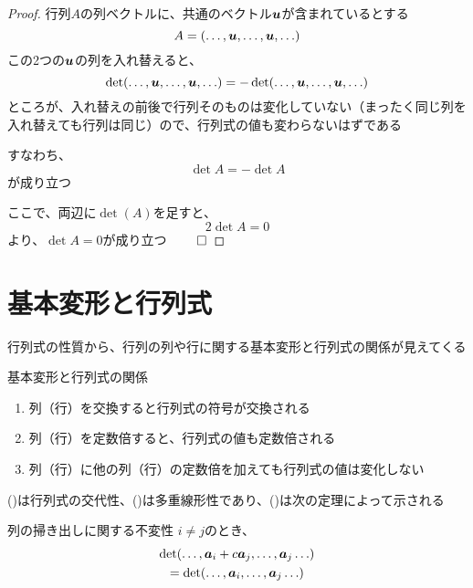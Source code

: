 \documentclass[../../../topic_linear-algebra]{subfiles}
\begin{document}
\begin{proof}
  行列$A$の列ベクトルに、共通のベクトル$\vb*{u}$が含まれているとする
  \begin{equation*}
    A = (\ldots, \vb*{u}, \ldots, \vb*{u}, \ldots)
  \end{equation*}
  この2つの$\vb*{u}$の列を入れ替えると、
  \begin{equation*}
    \det(\ldots, \vb*{u}, \ldots, \vb*{u}, \ldots) = -\det(\ldots, \vb*{u}, \ldots, \vb*{u}, \ldots)
  \end{equation*}
  ところが、入れ替えの前後で行列そのものは変化していない（まったく同じ列を入れ替えても行列は同じ）ので、行列式の値も変わらないはずである

  すなわち、
  \begin{equation*}
    \det A = -\det A
  \end{equation*}
  が成り立つ

  ここで、両辺に$\det(A)$を足すと、
  \begin{equation*}
    2\det A = 0
  \end{equation*}
  より、$\det A = 0$が成り立つ $\qed$
\end{proof}

\sectionline
\section{基本変形と行列式}

行列式の性質から、行列の列や行に関する基本変形と行列式の関係が見えてくる

\begin{theorem}{基本変形と行列式の関係}
  \begin{enumerate}[label=\romanlabel]
    \item 列（行）を交換すると行列式の符号が交換される
    \item 列（行）を定数倍すると、行列式の値も定数倍される
    \item 列（行）に他の列（行）の定数倍を加えても行列式の値は変化しない
  \end{enumerate}
\end{theorem}

()は行列式の交代性、()は多重線形性であり、()は次の定理によって示される

\begin{theorem}{列の掃き出しに関する不変性}
  $i \neq j$のとき、
  \begin{multline*}
    \det(\ldots, \vb*{a}_i + c \vb*{a}_j,\ldots, \vb*{a}_j \ldots) \\= \det(\ldots, \vb*{a}_i,\ldots, \vb*{a}_j \ldots)
  \end{multline*}
\end{theorem}
\end{document}
